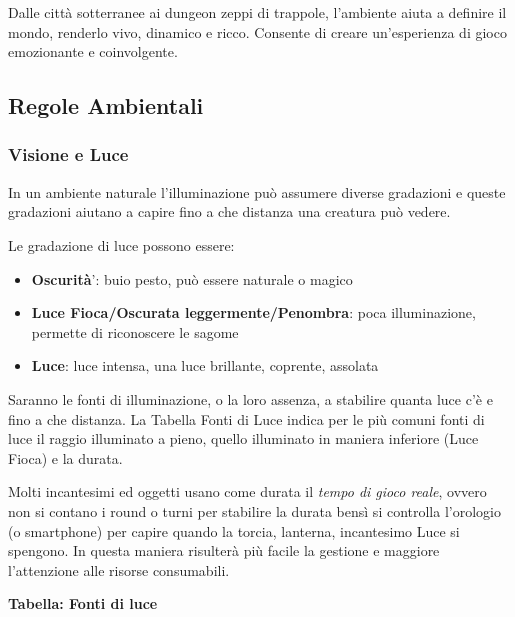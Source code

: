 \documentclass[12pt,a4paper,twoside,openany]{book}
\begin{document}
\begin{multicols}{2}
	
Dalle città sotterranee ai dungeon zeppi di trappole, l'ambiente aiuta a definire il mondo, renderlo vivo, dinamico e ricco. Consente di creare un'esperienza di gioco emozionante e coinvolgente.
	
\subsection{Regole Ambientali}

\label{regole-ambientali}

\subsubsection{Visione e Luce}

\label{sec:visione-e-luce}

In un ambiente naturale l'illuminazione può assumere diverse gradazioni e queste gradazioni aiutano a capire fino a che distanza una creatura può vedere.

Le gradazione di luce possono essere:
\begin{itemize}
\item
\textbf{Oscurità}': buio pesto, può essere naturale o magico
\item
\textbf{Luce Fioca/Oscurata leggermente/Penombra}: poca illuminazione, permette di riconoscere le sagome
\item
\textbf{Luce}: luce intensa, una luce brillante, coprente, assolata
\end{itemize}

Saranno le fonti di illuminazione, o la loro assenza, a stabilire quanta luce c'è e fino a che distanza. La Tabella Fonti di Luce indica per le più comuni fonti di luce il raggio illuminato a pieno, quello illuminato in maniera inferiore (Luce Fioca) e la durata.

Molti incantesimi ed oggetti usano come durata il \textit{tempo di gioco reale}, ovvero non si contano i round o turni per stabilire la durata bensì si controlla l'orologio (o smartphone) per capire quando la torcia, lanterna, incantesimo Luce si spengono. In questa maniera risulterà più facile la gestione e maggiore l'attenzione alle risorse consumabili.


\textbf{Tabella: Fonti di luce}

\medskip



\end{multicols}
\end{document}
